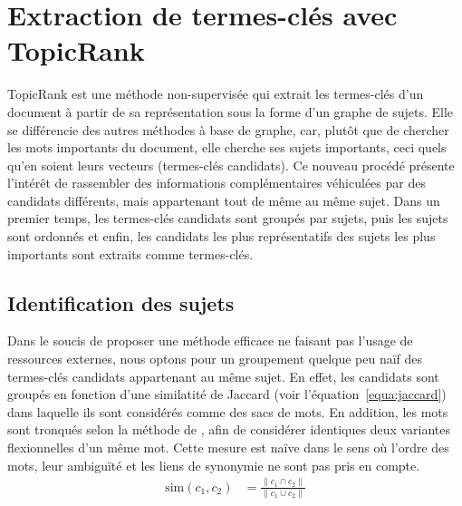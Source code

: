 \section{Extraction de termes-clés avec TopicRank}
\label{sec:extraction_de_termes_cles_avec_topicrank}
  TopicRank est une méthode non-supervisée qui extrait les termes-clés d'un
  document à partir de sa représentation sous la forme d'un graphe de sujets.
  Elle se différencie des autres méthodes à base de graphe, car, plutôt que de
  chercher les mots importants du document, elle cherche ses sujets importants,
  ceci quels qu'en soient leurs vecteurs (termes-clés candidats). Ce nouveau
  procédé présente l'intérêt de rassembler des informations complémentaires
  véhiculées par des candidats différents, mais appartenant tout de même au même
  sujet.
  Dans un premier temps, les termes-clés candidats sont groupés par sujets, puis
  les sujets sont ordonnés et enfin, les candidats les plus représentatifs des
  sujets les plus importants sont extraits comme termes-clés.

  \subsection{Identification des sujets}
  \label{subsec:identification_des_sujets}
    Dans le soucis de proposer une méthode efficace ne faisant pas l'usage de
    ressources externes, nous optons pour un groupement quelque peu naïf des
    termes-clés candidats appartenant au même sujet. En effet, les candidats
    sont groupés en fonction d'une similatité de Jaccard (voir
    l'équation~\ref{equa:jaccard}) dans laquelle ils sont considérés comme des
    sacs de mots. En addition, les mots sont tronqués selon la méthode de
    , afin de considérer identiques deux
    variantes flexionnelles d'un même mot. Cette mesure est naïve dans le sens
    où l'ordre des mots, leur ambiguïté et les liens de synonymie ne sont pas
    pris en compte.
    \begin{align}
      \text{sim}(c_1, c_2) &= \frac{\|c_1 \cap c_2\|}{\|c_1 \cup c_2\|} \label{equa:jaccard}
    \end{align}

